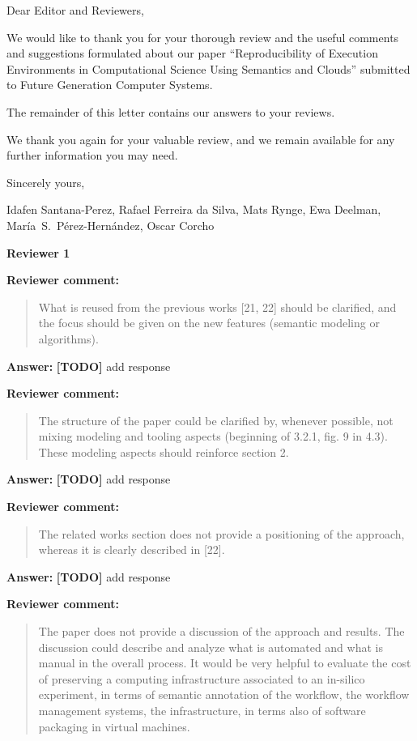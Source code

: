 \documentclass{letter}
\date{Aug 31, 2015}
\newenvironment{review}%
{\textbf{Reviewer comment:}\begin{quote}}%
{\end{quote}}%
\newcommand{\todo}[1]{%
      \color{red}\textbf{[TODO]} #1\color{black}}
\newcommand{\answer}[1]{%
      \textbf{Answer:} #1}
\newcommand{\revised}[1]{\emph{#1}\color{black}}
\begin{document}
\begin{letter}{}

\opening{Dear Editor and Reviewers,}

We would like to thank you for your thorough review and the useful
comments and suggestions formulated about our paper 
``Reproducibility of Execution Environments in Computational Science Using Semantics and Clouds'' 
submitted to Future Generation Computer Systems.

The remainder of this letter contains our answers to your reviews. 

We thank you again for your valuable review, and we remain available for any further information you may need.

\vspace{0.5cm}

Sincerely yours,

\vspace{1cm}

Idafen Santana-Perez, Rafael Ferreira da Silva, Mats Rynge, Ewa Deelman, Mar\'ia~S.~P\'erez-Hern\'andez, Oscar Corcho

\newpage


%
%
\textbf{Reviewer 1}


\begin{review}
What is reused from the previous works [21, 22] should be clarified, and the focus should be given on the new features (semantic modeling or algorithms).
\end{review}

\answer{\todo{add response}}

\revised{}


\begin{review}
The structure of the paper could be clarified by, whenever possible, not mixing modeling and tooling aspects (beginning of 3.2.1, fig. 9 in 4.3). These modeling aspects should reinforce section 2.
\end{review}

\answer{\todo{add response}}


\begin{review}
The related works section does not provide a positioning of the approach, whereas it is clearly described in [22].
\end{review}

\answer{\todo{add response}}


\begin{review}
The paper does not provide a discussion of the approach and results. The discussion could describe and analyze what is automated and what is manual in the overall process. It would be very helpful to evaluate the cost of preserving a computing infrastructure associated to an in-silico experiment, in terms of semantic annotation of the workflow, the workflow management systems, the infrastructure, in terms also of software packaging in virtual machines.
\end{review}


\end{letter}
\end{document}
